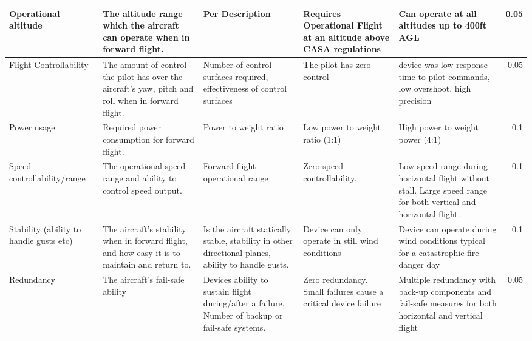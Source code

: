 \begin{table}[H]
{\begin{tabular}{|p{2cm}|p{4cm}|p{4cm}|p{4cm}|p{4cm}|r|}
Operational altitude                                & The altitude range which the aircraft can operate when in forward flight.                           & Per Description                                                                                    & Requires Operational Flight at an altitude above CASA regulations & Can operate at all altitudes up to 400ft AGL                                                                       & 0.05      \\ \hline
Flight Controllability                                     & The amount of control the pilot has over the aircraft's yaw, pitch and roll when in forward flight. & Number of control surfaces required, effectiveness of control surfaces                             & The pilot has zero control                                        & device was low response time to pilot commands, low overshoot, high precision                                      & 0.05      \\ \hline
Power usage                                         & Required power consumption for forward flight.                                                      & Power to weight ratio                                                                              & Low power to weight ratio (1:1)                                   & High power to weight power (4:1)                                                                                   & 0.1       \\ \hline
Speed controllability/range                         & The operational speed range and ability to control speed output.                                    & Forward flight operational range                                                                   & Zero speed controllability.                                       & Low speed range during horizontal flight without stall. Large speed range for both vertical and horizontal flight. & 0.1       \\ \hline
Stability (ability to handle gusts etc)             & The aircraft's stability when in forward flight, and how easy it is to maintain and return to.      & Is the aircraft statically stable, stability in other directional planes, ability to handle gusts. & Device can only operate in still wind conditions                  & Device can operate during wind conditions typical for a catastrophic fire danger day                               & 0.1       \\ \hline
Redundancy                                          & The aircraft's fail-safe ability                                                                      & Devices ability to sustain flight during/after a failure. Number of backup or fail-safe systems.   & Zero redundancy. Small failures cause a critical device failure   & Multiple redundancy with back-up components and fail-safe measures for both horizontal and vertical flight         & 0.05      \\ \hline
\end{tabular}%
}
\end{table}



